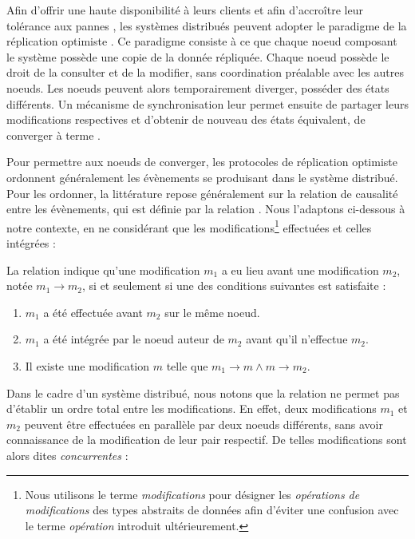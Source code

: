 \label{sec:etat-art-crdts-intro}

Afin d'offrir une haute disponibilité à leurs clients et afin d'accroître leur tolérance aux pannes \cite{2016-trade-offs-replicated-systems-guerraoui}, les systèmes distribués peuvent adopter le paradigme de la réplication optimiste \cite{2005-optimistic-replication-saito}.
Ce paradigme consiste à ce que chaque noeud composant le système possède une copie de la donnée répliquée.
Chaque noeud possède le droit de la consulter et de la modifier, sans coordination préalable avec les autres noeuds.
Les noeuds peuvent alors temporairement diverger, \ie posséder des états différents.
Un mécanisme de synchronisation leur permet ensuite de partager leurs modifications respectives et d'obtenir de nouveau des états équivalent, \ie de converger à terme \cite{10.1145/224057.224070}.

Pour permettre aux noeuds de converger, les protocoles de réplication optimiste ordonnent généralement les évènements se produisant dans le système distribué.
Pour les ordonner, la littérature repose généralement sur la relation de causalité entre les évènements, qui est définie par la relation \hb \cite{1978-happen-before-lamport}.
Nous l'adaptons ci-dessous à notre contexte, en ne considérant que les modifications\footnote{Nous utilisons le terme \emph{modifications} pour désigner les \emph{opérations de modifications} des types abstraits de données afin d'éviter une confusion avec le terme \emph{opération} introduit ultérieurement.} effectuées et celles intégrées :

\begin{definition}[Relation \hb]
  La relation \hb indique qu'une modification $m_1$ a eu lieu avant une modification $m_2$, notée $m_1 \rightarrow m_2$, si et seulement si une des conditions suivantes est satisfaite :
  \begin{enumerate}
    \item $m_1$ a été effectuée avant $m_2$ sur le même noeud.
    \item $m_1$ a été intégrée par le noeud auteur de $m_2$ avant qu'il n'effectue $m_2$.
    \item Il existe une modification $m$ telle que $m_1 \rightarrow m \land m \rightarrow m_2$.
  \end{enumerate}
\end{definition}

Dans le cadre d'un système distribué, nous notons que la relation \hb ne permet pas d'établir un ordre total entre les modifications.
En effet, deux modifications $m_1$ et $m_2$ peuvent être effectuées en parallèle par deux noeuds différents, sans avoir connaissance de la modification de leur pair respectif.
De telles modifications sont alors dites \emph{concurrentes} :

